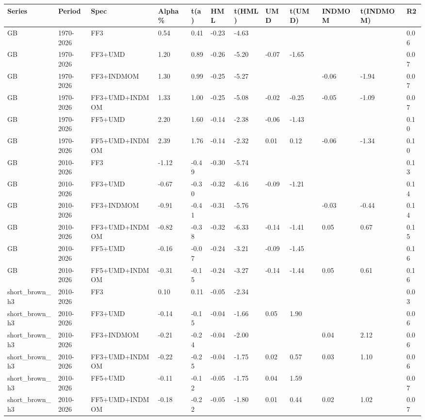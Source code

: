 \begin{tabular}{llllllllllll}
\toprule
Series & Period & Spec & Alpha \% & t(a) & HML & t(HML) & UMD & t(UMD) & INDMOM & t(INDMOM) & R2 \\
\midrule
GB & 1970-2026 & FF3 & 0.54 & 0.41 & -0.23 & -4.63 &  &  &  &  & 0.06 \\
GB & 1970-2026 & FF3+UMD & 1.20 & 0.89 & -0.26 & -5.20 & -0.07 & -1.65 &  &  & 0.07 \\
GB & 1970-2026 & FF3+INDMOM & 1.30 & 0.99 & -0.25 & -5.27 &  &  & -0.06 & -1.94 & 0.07 \\
GB & 1970-2026 & FF3+UMD+INDMOM & 1.33 & 1.00 & -0.25 & -5.08 & -0.02 & -0.25 & -0.05 & -1.09 & 0.07 \\
GB & 1970-2026 & FF5+UMD & 2.20 & 1.60 & -0.14 & -2.38 & -0.06 & -1.43 &  &  & 0.10 \\
GB & 1970-2026 & FF5+UMD+INDMOM & 2.39 & 1.76 & -0.14 & -2.32 & 0.01 & 0.12 & -0.06 & -1.34 & 0.10 \\
GB & 2010-2026 & FF3 & -1.12 & -0.49 & -0.30 & -5.74 &  &  &  &  & 0.13 \\
GB & 2010-2026 & FF3+UMD & -0.67 & -0.30 & -0.32 & -6.16 & -0.09 & -1.21 &  &  & 0.14 \\
GB & 2010-2026 & FF3+INDMOM & -0.91 & -0.41 & -0.31 & -5.76 &  &  & -0.03 & -0.44 & 0.14 \\
GB & 2010-2026 & FF3+UMD+INDMOM & -0.82 & -0.38 & -0.32 & -6.33 & -0.14 & -1.41 & 0.05 & 0.67 & 0.15 \\
GB & 2010-2026 & FF5+UMD & -0.16 & -0.07 & -0.24 & -3.21 & -0.09 & -1.45 &  &  & 0.16 \\
GB & 2010-2026 & FF5+UMD+INDMOM & -0.31 & -0.15 & -0.24 & -3.27 & -0.14 & -1.44 & 0.05 & 0.61 & 0.16 \\
short\_brown\_h3 & 2010-2026 & FF3 & 0.10 & 0.11 & -0.05 & -2.34 &  &  &  &  & 0.03 \\
short\_brown\_h3 & 2010-2026 & FF3+UMD & -0.14 & -0.15 & -0.04 & -1.66 & 0.05 & 1.90 &  &  & 0.06 \\
short\_brown\_h3 & 2010-2026 & FF3+INDMOM & -0.21 & -0.24 & -0.04 & -2.00 &  &  & 0.04 & 2.12 & 0.06 \\
short\_brown\_h3 & 2010-2026 & FF3+UMD+INDMOM & -0.22 & -0.25 & -0.04 & -1.75 & 0.02 & 0.57 & 0.03 & 1.10 & 0.06 \\
short\_brown\_h3 & 2010-2026 & FF5+UMD & -0.11 & -0.12 & -0.05 & -1.75 & 0.04 & 1.59 &  &  & 0.07 \\
short\_brown\_h3 & 2010-2026 & FF5+UMD+INDMOM & -0.18 & -0.22 & -0.05 & -1.80 & 0.01 & 0.44 & 0.02 & 1.02 & 0.07 \\

\end{tabular}
